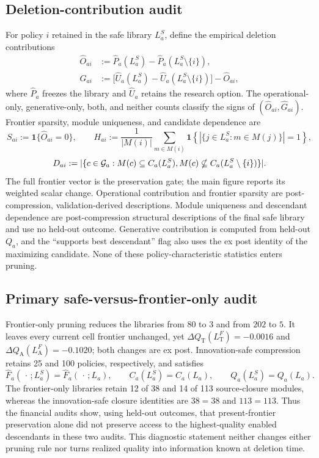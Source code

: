 \subsection{Deletion-contribution audit}

For policy \(i\) retained in the safe library \(L_a^S\), define the empirical
deletion contributions
\begin{align}
  \widehat O_{ai}
    &:=\widehat P_a(L_a^S)-\widehat P_a(L_a^S\setminus\{i\}),\nonumber\\
  \widehat G_{ai}
    &:={}
      \bigl[\widehat U_a(L_a^S)
       -\widehat U_a(L_a^S\setminus\{i\})\bigr]-\widehat O_{ai},
  \label{eq:supp-financial-policy-contributions}
\end{align}
where \(\widehat P_a\) freezes the library and \(\widehat U_a\) retains the
research option.  The operational-only, generative-only, both, and neither
counts classify the signs of \((\widehat O_{ai},\widehat G_{ai})\).  Frontier
sparsity, module uniqueness, and candidate dependence are
\[
 S_{ai}:=\mathbf 1\{\widehat O_{ai}=0\},\qquad
 H_{ai}:=\frac{1}{|M(i)|}\sum_{m\in M(i)}
   \mathbf 1\!\left\{|\{j\in L_a^S:m\in M(j)\}|=1\right\},
\]
\[
 D_{ai}:=
 |\{c\in\mathcal G_a:
   M(c)\subseteq C_a(L_a^S),\\
   M(c)\nsubseteq C_a(L_a^S\setminus\{i\})\}|.
\]
The full frontier vector is the preservation gate; the main figure reports
its weighted scalar change.  Operational contribution and frontier sparsity
are post-compression, validation-derived descriptions.  Module uniqueness
and descendant dependence are post-compression structural descriptions of the
final safe library and use no held-out outcome.  Generative contribution is
computed from held-out \(Q_a\), and the ``supports best descendant'' flag also
uses the ex post identity of the maximizing candidate.  None of these
policy-characteristic statistics enters pruning.

\subsection{Primary safe-versus-frontier-only audit}

Frontier-only pruning reduces the libraries from \(80\) to \(3\) and from
\(202\) to \(5\).  It leaves every current cell frontier unchanged, yet
\(\Delta Q_{\mathrm T}(L_{\mathrm T}^F)=-0.0016\) and
\(\Delta Q_{\mathrm A}(L_{\mathrm A}^F)=-0.1020\); both changes are ex post.
Innovation-safe compression retains 25 and 100 policies, respectively, and
satisfies
\[
  \widehat F_a(\,\cdot\,;L_a^S)=\widehat F_a(\,\cdot\,;L_a),\qquad
  C_a(L_a^S)=C_a(L_a),\qquad
  Q_a(L_a^S)=Q_a(L_a).
\]
The frontier-only libraries retain 12 of 38 and 14 of 113 source-closure
modules, whereas the innovation-safe closure identities are \(38=38\) and
\(113=113\).  Thus the financial audits show, using held-out outcomes, that
present-frontier preservation alone did not preserve access to the
highest-quality enabled descendants in these two audits.  This diagnostic
statement neither changes either pruning rule nor turns realized quality into
information known at deletion time.

